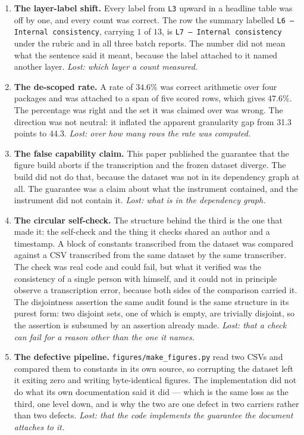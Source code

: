 \documentclass[sigconf,review]{acmart}
\begin{document}
\begin{enumerate}
\setlength{\topsep}{2pt}\setlength{\itemsep}{2pt}\setlength{\parsep}{0pt}

\item \textbf{The layer-label shift.} Every label from \texttt{L3} upward in a
headline table was off by one, and every count was correct. The row the summary
labelled \texttt{L6 --- Internal consistency}, carrying $1$ of $13$, is
\texttt{L7 --- Internal consistency} under the rubric and in all three batch
reports. The number did not mean what the sentence said it meant, because the
label attached to it named another layer. \emph{Lost: which layer a count
measured.}

\item \textbf{The de-scoped rate.} A rate of $34.6\%$ was correct arithmetic
over four packages and was attached to a span of five scored rows, which gives
$47.6\%$. The percentage was right and the set it was claimed over was wrong.
The direction was not neutral: it inflated the apparent granularity gap from
31.3 points to 44.3. \emph{Lost: over how many rows the rate was computed.}

\item \textbf{The false capability claim.} This paper published the guarantee
that the figure build aborts if the transcription and the frozen dataset
diverge. The build did not do that, because the dataset was not in its
dependency graph at all. The guarantee was a claim about what the instrument
contained, and the instrument did not contain it. \emph{Lost: what is in the
dependency graph.}

\item \textbf{The circular self-check.} The structure behind the third is the
one that made it: the self-check and the thing it checks shared an author and
a timestamp. A block of constants transcribed from the dataset was compared
against a CSV transcribed from the same dataset by the same transcriber. The
check was real code and could fail, but what it verified was the consistency of
a single person with himself, and it could not in principle observe a
transcription error, because both sides of the comparison carried it. The
disjointness assertion the same audit found is the same structure in its purest
form: two disjoint sets, one of which is empty, are trivially disjoint, so the
assertion is subsumed by an assertion already made. \emph{Lost: that a check
can fail for a reason other than the one it names.}

\item \textbf{The defective pipeline.} \texttt{figures/make\_figures.py} read
two CSVs and compared them to constants in its own source, so corrupting the
dataset left it exiting zero and writing byte-identical figures. The
implementation did not do what its own documentation said it did --- which is
the same loss as the third, one level down, and is why the two are one defect
in two carriers rather than two defects. \emph{Lost: that the code implements
the guarantee the document attaches to it.}

\end{enumerate}
\end{document}
